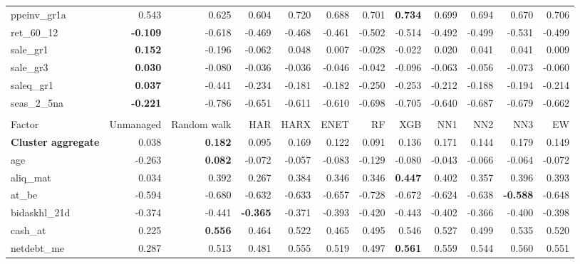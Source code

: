 \begin{landscape}
\begin{longtable}{>{\raggedright\arraybackslash}p{2.6cm}rrrrrrrrrrr}
ppeinv\_gr1a & 0.543 & 0.625 & 0.604 & \cellcolor{blue!10}0.720 & \cellcolor{blue!10}0.688 & \cellcolor{blue!10}0.701 & \textbf{\cellcolor{blue!10}0.734} & \cellcolor{blue!10}0.699 & \cellcolor{blue!10}0.694 & \cellcolor{blue!10}0.670 & \cellcolor{blue!10}0.706 \\
ret\_60\_12 & \textbf{-0.109} & -0.618 & -0.469 & -0.468 & -0.461 & -0.502 & -0.514 & -0.492 & -0.499 & -0.531 & -0.499 \\
sale\_gr1 & \textbf{0.152} & -0.196 & -0.062 & 0.048 & 0.007 & -0.028 & -0.022 & 0.020 & 0.041 & 0.041 & 0.009 \\
sale\_gr3 & \textbf{0.030} & -0.080 & -0.036 & -0.036 & -0.046 & -0.042 & -0.096 & -0.063 & -0.056 & -0.073 & -0.060 \\
saleq\_gr1 & \textbf{0.037} & -0.441 & -0.234 & -0.181 & -0.182 & -0.250 & -0.253 & -0.212 & -0.188 & -0.194 & -0.214 \\
seas\_2\_5na & \textbf{-0.221} & -0.786 & -0.651 & -0.611 & -0.610 & -0.698 & -0.705 & -0.640 & -0.687 & -0.679 & -0.662 \\
\hline
\multicolumn{12}{@{}l}{\textit{Panel D. Low Leverage}} \\
\hline
Factor & Unmanaged & Random walk & HAR & HARX & ENET & RF & XGB & NN1 & NN2 & NN3 & EW \\
\hline
\textbf{Cluster aggregate} & 0.038 & \textbf{0.182} & 0.095 & 0.169 & 0.122 & 0.091 & 0.136 & 0.171 & 0.144 & 0.179 & 0.149 \\
age & -0.263 & \textbf{0.082} & -0.072 & -0.057 & -0.083 & -0.129 & -0.080 & -0.043 & -0.066 & -0.064 & -0.072 \\
aliq\_mat & 0.034 & 0.392 & 0.267 & 0.384 & 0.346 & 0.346 & \textbf{\cellcolor{blue!10}0.447} & \cellcolor{blue!10}0.402 & 0.357 & \cellcolor{blue!10}0.396 & \cellcolor{blue!10}0.393 \\
at\_be & -0.594 & -0.680 & -0.632 & -0.633 & -0.657 & -0.728 & -0.672 & -0.624 & -0.638 & \textbf{\cellcolor{blue!10}-0.588} & -0.648 \\
bidaskhl\_21d & -0.374 & -0.441 & \textbf{\cellcolor{blue!10}-0.365} & \cellcolor{blue!10}-0.371 & -0.393 & -0.420 & -0.443 & -0.402 & \cellcolor{blue!10}-0.366 & -0.400 & -0.398 \\
cash\_at & 0.225 & \textbf{0.556} & 0.464 & 0.522 & 0.465 & 0.495 & 0.546 & 0.527 & 0.499 & 0.535 & 0.520 \\
netdebt\_me & 0.287 & 0.513 & 0.481 & \cellcolor{blue!10}0.555 & \cellcolor{blue!10}0.519 & 0.497 & \textbf{\cellcolor{blue!10}0.561} & \cellcolor{blue!10}0.559 & \cellcolor{blue!10}0.544 & \cellcolor{blue!10}0.560 & \cellcolor{blue!10}0.551 \\

\end{longtable}
\end{landscape}
